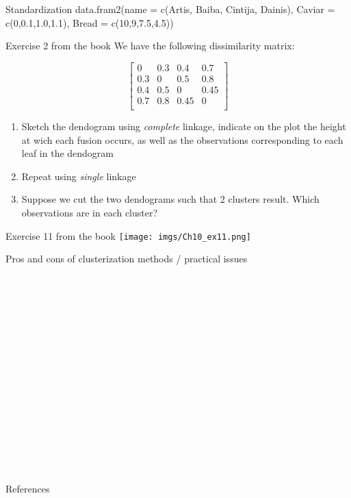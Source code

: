 \documentclass[
  10pt,
  ignorenonframetext,
]{beamer}
\begin{document}
\begin{frame}{Standardization}
\label{standardization}
data.fram2(name = c(Artis, Baiba, Cintija, Dainis), Caviar =
c(0,0.1,1.0,1.1), Bread = c(10,9,7.5,4.5))
\end{frame}

\begin{frame}{Exercise 2 from the book}
\label{exercise-2-from-the-book}
We have the following dissimilarity matrix:

\[\begin{bmatrix}0&0.3&0.4&0.7 \\0.3&0&0.5&0.8 \\0.4&0.5&0&0.45 \\0.7&0.8&0.45&0 \\\end{bmatrix}\]

\begin{enumerate}
\item
  Sketch the dendogram using \emph{complete} linkage, indicate on the
  plot the height at wich each fusion occurs, as well as the
  observations corresponding to each leaf in the dendogram
\item
  Repeat using \emph{single} linkage
\item
  Suppose we cut the two dendograms such that 2 clusters result. Which
  observations are in each cluster?
\end{enumerate}
\end{frame}

\begin{frame}{Exercise 11 from the book}
\label{exercise-11-from-the-book}
\texttt{[image: imgs/Ch10\_ex11.png]}
\end{frame}

\begin{frame}
\begin{block}{Pros and cons of clusterization methods / practical
issues}
\label{pros-and-cons-of-clusterization-methods-practical-issues}
\(~\)

\(~\)

\(~\)

\(~\)

\(~\)

\(~\)

\(~\)

\(~\)

\(~\)

\(~\)
\end{block}
\end{frame}

\begin{frame}{References}
\label{references}
\end{frame}
\end{document}
